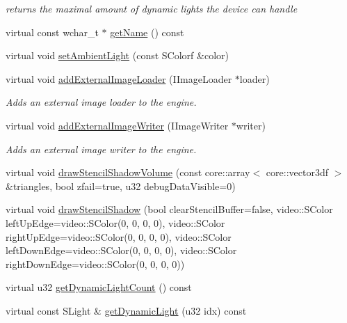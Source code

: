 \begin{DoxyCompactItemize}
\begin{DoxyCompactList}\small\item\em returns the maximal amount of dynamic lights the device can handle \end{DoxyCompactList}\item 
virtual const wchar\-\_\-t $\ast$ \hyperlink{classirr_1_1video_1_1_c_null_driver_a0073a2daf8c0de73a4e2e05538214d2b}{get\-Name} () const 
\item 
virtual void \hyperlink{classirr_1_1video_1_1_c_null_driver_a59ba9575e4c138ace4c63dcb92a5271a}{set\-Ambient\-Light} (const S\-Colorf \&color)
\item 
virtual void \hyperlink{classirr_1_1video_1_1_c_null_driver_a9a0a84ed36c5ee1509879f8edce4c17f}{add\-External\-Image\-Loader} (I\-Image\-Loader $\ast$loader)
\begin{DoxyCompactList}\small\item\em Adds an external image loader to the engine. \end{DoxyCompactList}\item 
virtual void \hyperlink{classirr_1_1video_1_1_c_null_driver_a4639fbf743b92312f5e33c529a274e65}{add\-External\-Image\-Writer} (I\-Image\-Writer $\ast$writer)
\begin{DoxyCompactList}\small\item\em Adds an external image writer to the engine. \end{DoxyCompactList}\item 
virtual void \hyperlink{classirr_1_1video_1_1_c_null_driver_a9ff3c41ad57ae9ce0256cd223b18669e}{draw\-Stencil\-Shadow\-Volume} (const core\-::array$<$ core\-::vector3df $>$ \&triangles, bool zfail=true, u32 debug\-Data\-Visible=0)
\item 
virtual void \hyperlink{classirr_1_1video_1_1_c_null_driver_a97fb6760379e4934f608015eaea9a230}{draw\-Stencil\-Shadow} (bool clear\-Stencil\-Buffer=false, video\-::\-S\-Color left\-Up\-Edge=video\-::\-S\-Color(0, 0, 0, 0), video\-::\-S\-Color right\-Up\-Edge=video\-::\-S\-Color(0, 0, 0, 0), video\-::\-S\-Color left\-Down\-Edge=video\-::\-S\-Color(0, 0, 0, 0), video\-::\-S\-Color right\-Down\-Edge=video\-::\-S\-Color(0, 0, 0, 0))
\item 
virtual u32 \hyperlink{classirr_1_1video_1_1_c_null_driver_ac924f4a1953a728dd38c82978c70b150}{get\-Dynamic\-Light\-Count} () const 
\item 
virtual const S\-Light \& \hyperlink{classirr_1_1video_1_1_c_null_driver_ac3fcab1207da4425671f3d2189f7e95f}{get\-Dynamic\-Light} (u32 idx) const 

\end{DoxyCompactItemize}
